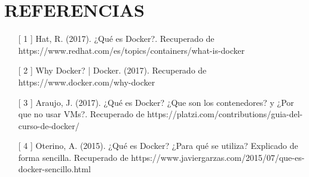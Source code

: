 \section{REFERENCIAS} 

\begin{itemize}
	\item [[ 1]] Hat, R. (2017). ¿Qué es Docker?. Recuperado de https://www.redhat.com/es/topics/containers/what-is-docker
	\item  [[ 2]] Why Docker? | Docker. (2017). Recuperado de https://www.docker.com/why-docker
 	\item   [[ 3]] Araujo, J. (2017). ¿Qué es Docker? ¿Que son los contenedores? y ¿Por que no usar VMs?. Recuperado de https://platzi.com/contributions/guia-del-curso-de-docker/
	\item  [[ 4]]  Oterino, A. (2015). ¿Qué es Docker? ¿Para qué se utiliza? Explicado de forma sencilla. Recuperado de https://www.javiergarzas.com/2015/07/que-es-docker-sencillo.html
\end{itemize}


